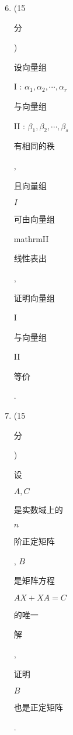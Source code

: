 \documentclass[10pt]{article}
\begin{document}
\begin{enumerate}
  \setcounter{enumi}{5}
  \item (15 \begin{CJK}{UTF8}{mj}分\end{CJK}) \begin{CJK}{UTF8}{mj}设向量组\end{CJK} I : $\alpha_{1}, \alpha_{2}, \cdots, \alpha_{r}$ \begin{CJK}{UTF8}{mj}与向量组\end{CJK} II : $\beta_{1}, \beta_{2}, \cdots, \beta_{s}$ \begin{CJK}{UTF8}{mj}有相同的秩\end{CJK}, \begin{CJK}{UTF8}{mj}且向量组\end{CJK} $I$ \begin{CJK}{UTF8}{mj}可由向量组\end{CJK} mathrmII \begin{CJK}{UTF8}{mj}线性表出\end{CJK}, \begin{CJK}{UTF8}{mj}证明向量组\end{CJK} I \begin{CJK}{UTF8}{mj}与向量组\end{CJK} II \begin{CJK}{UTF8}{mj}等价\end{CJK}.

  \item (15 \begin{CJK}{UTF8}{mj}分\end{CJK}) \begin{CJK}{UTF8}{mj}设\end{CJK} $A, C$ \begin{CJK}{UTF8}{mj}是实数域上的\end{CJK} $n$ \begin{CJK}{UTF8}{mj}阶正定矩阵\end{CJK}, $B$ \begin{CJK}{UTF8}{mj}是矩阵方程\end{CJK} $A X+X A=C$ \begin{CJK}{UTF8}{mj}的唯一\end{CJK} \begin{CJK}{UTF8}{mj}解\end{CJK}, \begin{CJK}{UTF8}{mj}证明\end{CJK} $B$ \begin{CJK}{UTF8}{mj}也是正定矩阵\end{CJK}.


\end{enumerate}
\end{document}
